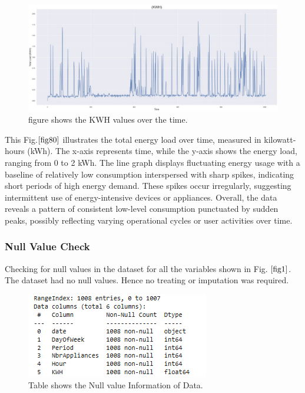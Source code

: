 \documentclass[english,12pt, titlepage]{article}
\begin{document}
	\begin{figure}[!ht]
		\centering
		\includegraphics[width=0.6\linewidth]{fig35.jpeg}
		\caption{figure shows the KWH values over the time.}\label{fig80}
	\end{figure}
	
	This Fig.$\ref{fig80}$ illustrates the total energy load over time, measured in kilowatt-hours (kWh). The x-axis represents time, while the y-axis shows the energy load, ranging from 0 to 2 kWh. The line graph displays fluctuating energy usage with a baseline of relatively low consumption interspersed with sharp spikes, indicating short periods of high energy demand. These spikes occur irregularly, suggesting intermittent use of energy-intensive devices or appliances. Overall, the data reveals a pattern of consistent low-level consumption punctuated by sudden peaks, possibly reflecting varying operational cycles or user activities over time.
	
	
	\subsubsection{Null Value Check}
	
	Checking for null values in the dataset for all the variables shown in Fig. $\ref{fig1}$.
	The dataset had no null values. Hence no treating or imputation was required.
	
	\begin{figure}[!ht]
		\centering
		\includegraphics[width=0.6\linewidth]{tb1.png}
		\caption{Table shows the Null value Information of Data.}\label{fig1}
	\end{figure} 
	
\end{document}
